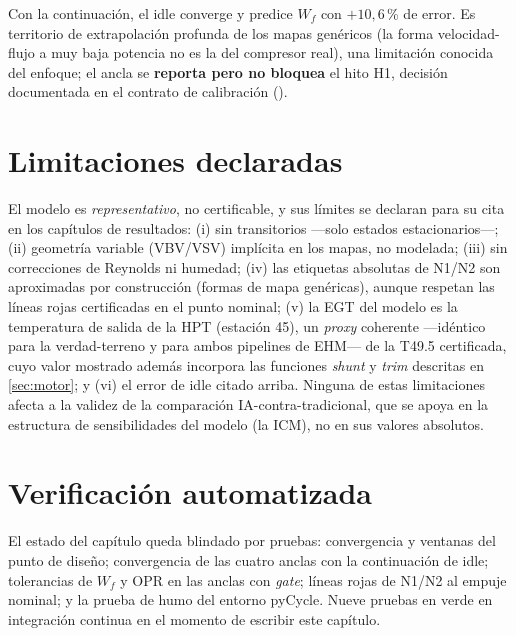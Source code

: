 Con la continuación, el idle converge y predice $W_f$ con $+10{,}6$\,\% de error. Es territorio
de extrapolación profunda de los mapas genéricos (la forma velocidad-flujo a muy baja potencia
no es la del compresor real), una limitación conocida del enfoque; el ancla se \textbf{reporta
pero no bloquea} el hito H1, decisión documentada en el contrato de calibración
().

\section{Limitaciones declaradas}
\label{sec:limitaciones}

El modelo es \emph{representativo}, no certificable, y sus límites se declaran para su cita en
los capítulos de resultados: (i) sin transitorios ---solo estados estacionarios---; (ii)
geometría variable (VBV/VSV) implícita en los mapas, no modelada; (iii) sin correcciones de
Reynolds ni humedad; (iv) las etiquetas absolutas de N1/N2 son aproximadas por construcción
(formas de mapa genéricas), aunque respetan las líneas rojas certificadas en el punto nominal;
(v) la EGT del modelo es la temperatura de salida de la HPT (estación 45), un \emph{proxy}
coherente ---idéntico para la verdad-terreno y para ambos pipelines de EHM--- de la T49.5
certificada, cuyo valor mostrado además incorpora las funciones \emph{shunt} y \emph{trim}
descritas en \cref{sec:motor}; y (vi) el error de idle citado arriba. Ninguna de estas
limitaciones afecta a la validez de la comparación IA-contra-tradicional, que se apoya en la
estructura de sensibilidades del modelo (la ICM), no en sus valores absolutos.

\section{Verificación automatizada}

El estado del capítulo queda blindado por pruebas: convergencia y ventanas del punto de diseño;
convergencia de las cuatro anclas con la continuación de idle; tolerancias de $W_f$ y OPR en las
anclas con \emph{gate}; líneas rojas de N1/N2 al empuje nominal; y la prueba de humo del entorno
pyCycle. Nueve pruebas en verde en integración continua en el momento de escribir este
capítulo.

